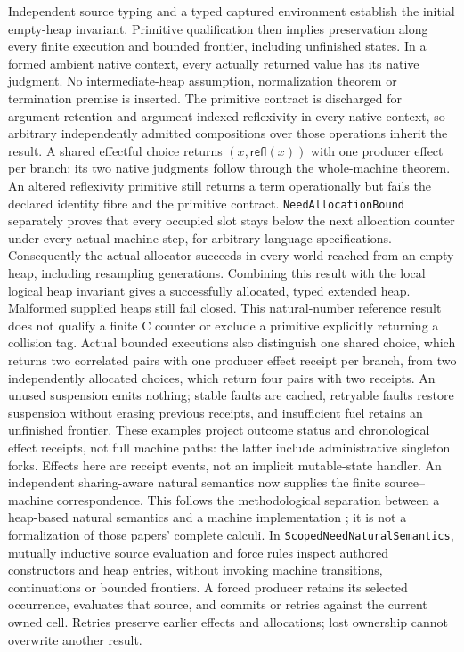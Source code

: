 \documentclass[11pt]{article}
\theoremstyle{definition}
\theoremstyle{remark}
\begin{document}
Independent source typing and a typed captured environment establish the
initial empty-heap invariant. Primitive qualification then implies preservation
along every finite execution and bounded frontier, including unfinished states.
In a formed ambient native context, every actually returned value has its
native judgment. No intermediate-heap assumption, normalization theorem or
termination premise is inserted. The primitive contract is discharged for
argument retention and argument-indexed reflexivity in every native context,
so arbitrary independently admitted compositions over those operations inherit
the result. A shared effectful choice returns $(x,\mathsf{refl}(x))$ with one
producer effect per branch; its two native judgments follow through the
whole-machine theorem. An altered reflexivity primitive still returns a term
operationally but fails the declared identity fibre and the primitive contract.
\nolinkurl{NeedAllocationBound} separately proves that every occupied
slot stays below the next allocation counter under every actual machine step,
for arbitrary language specifications. Consequently the actual allocator
succeeds in every world reached from an empty heap, including resampling
generations. Combining this result with the local logical heap invariant
gives a successfully allocated, typed extended heap. Malformed supplied heaps
still fail closed. This natural-number reference result does not qualify a
finite C counter or exclude a primitive explicitly returning a collision tag.
Actual bounded executions also distinguish
one shared choice, which returns two correlated pairs with one producer
effect receipt per branch, from two independently allocated choices, which
return four pairs with two receipts. An unused suspension emits nothing;
stable faults are cached, retryable faults restore suspension without
erasing previous receipts, and insufficient fuel retains an unfinished
frontier. These examples project outcome status and chronological effect
receipts, not full machine paths: the latter include administrative singleton
forks. Effects here are receipt events, not an implicit mutable-state handler.
An independent sharing-aware natural semantics now supplies the finite
source--machine correspondence. This follows the methodological separation
between a heap-based natural semantics and a machine implementation
\cite{LaunchburyNatural,NakataHasegawaNeed}; it is not a formalization of
those papers' complete calculi. In
\nolinkurl{ScopedNeedNaturalSemantics}, mutually inductive source evaluation
and force rules inspect authored constructors and heap entries, without
invoking machine transitions, continuations or bounded frontiers. A forced
producer retains its selected occurrence, evaluates that source, and commits
or retries against the current owned cell. Retries preserve earlier effects
and allocations; lost ownership cannot overwrite another result.
\end{document}
